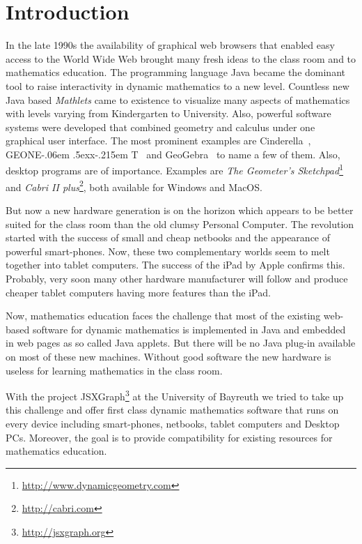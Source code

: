 \documentclass[12pt,a4paper]{article}%
\def\GEONExT{GEONE\kern-.06em \lower.5ex\hbox{x}\kern-.215em T}
\begin{document}
\section{Introduction}
In the late 1990s the availability of graphical web browsers that enabled easy access to the 
World Wide Web 
brought many fresh ideas to the class room and to mathematics education. 
The programming language Java became the dominant tool to raise interactivity in 
dynamic mathematics to a new level. Countless new Java based \emph{Mathlets} came to existence 
to visualize many aspects of mathematics with levels varying from Kindergarten to University. 
Also, powerful software systems were developed that combined geometry and calculus 
under one graphical user interface. The most prominent examples are 
Cinderella~\cite{kortenkamp1999}, \GEONExT~\cite{ehmann2003} and GeoGebra~\cite{hohenwarter2005} 
to name a few of them.
Also, desktop programs are of importance. Examples are
{\sl The Geometer's Sketchpad}\footnote{\href{http://www.dynamicgeometry.com}{http://www.dynamicgeometry.com}} 
and {\sl Cabri II plus}\footnote{\href{http://cabri.com}{http://cabri.com}}, 
both available for Windows and MacOS.

But now a new hardware generation is on the horizon which appears to be better suited 
for the class room than the old clumsy Personal Computer. 
The revolution started with the success of small and cheap netbooks and the appearance of 
powerful smart-phones. 
Now, these two complementary worlds seem to melt together into tablet computers. 
The success of the iPad by Apple confirms this. 
Probably, very soon many other hardware manufacturer will follow and produce 
cheaper tablet computers having more features than the iPad.

Now, mathematics education faces the challenge that most of the existing web-based software 
for dynamic mathematics is implemented in Java and embedded in web pages as so called Java applets.  
But there will be no Java plug-in available on most of these new machines. 
Without good software the new hardware is useless for learning mathematics 
in the class room.

With the project JSXGraph\footnote{\href{http://jsxgraph.org}{http://jsxgraph.org}} 
at the University of Bayreuth we tried to take up 
this challenge and offer first class dynamic mathematics software that runs on 
every device including smart-phones, netbooks, tablet computers and Desktop PCs. 
Moreover, the goal is to provide compatibility for existing resources for 
mathematics education. 
\end{document}
